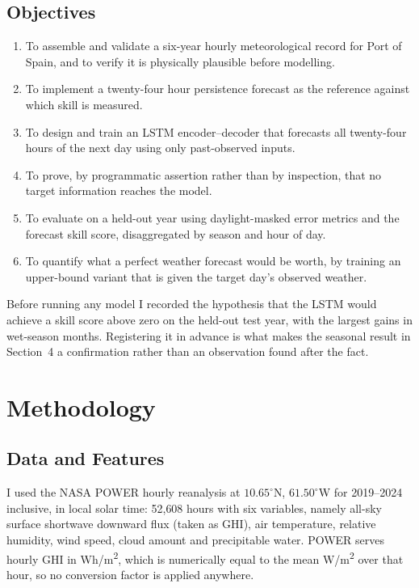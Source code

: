 \documentclass{article}
\begin{document}
\subsection{Objectives}

\begin{enumerate}[noitemsep,topsep=2pt]
    \item To assemble and validate a six-year hourly meteorological record for
      Port of Spain, and to verify it is physically plausible before modelling.
    \item To implement a twenty-four hour persistence forecast as the reference
      against which skill is measured.
    \item To design and train an LSTM encoder--decoder that forecasts all
      twenty-four hours of the next day using only past-observed inputs.
    \item To prove, by programmatic assertion rather than by inspection, that no
      target information reaches the model.
    \item To evaluate on a held-out year using daylight-masked error metrics and
      the forecast skill score, disaggregated by season and hour of day.
    \item To quantify what a perfect weather forecast would be worth, by training
      an upper-bound variant that is given the target day's observed weather.
\end{enumerate}

Before running any model I recorded the hypothesis that the LSTM would achieve a
skill score above zero on the held-out test year, with the largest gains in
wet-season months. Registering it in advance is what makes the seasonal result in
Section~4 a confirmation rather than an observation found after the fact.

\section{Methodology}

\subsection{Data and Features}

I used the NASA POWER hourly reanalysis \cite{sparks2018nasapower} at
$10.65^\circ$N, $61.50^\circ$W for 2019--2024 inclusive, in local solar time:
52{,}608 hours with six variables, namely all-sky surface shortwave downward flux
(taken as GHI), air temperature, relative humidity, wind speed, cloud amount and
precipitable water. POWER serves hourly GHI in Wh/m\textsuperscript{2}, which is
numerically equal to the mean W/m\textsuperscript{2} over that hour, so no
conversion factor is applied anywhere.
\end{document}

